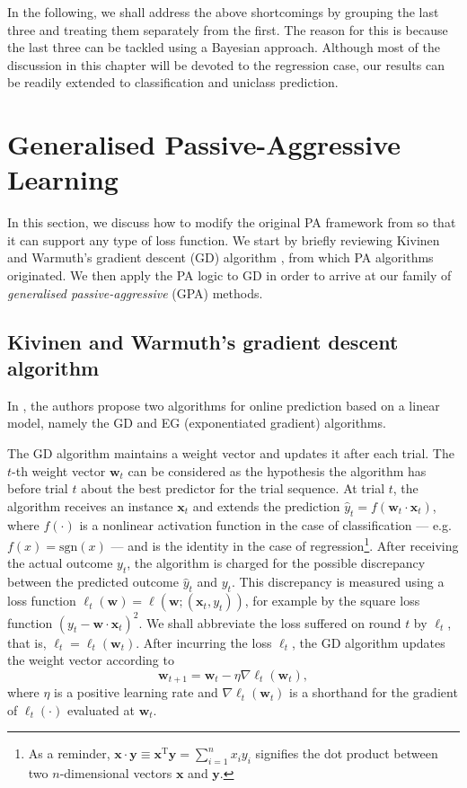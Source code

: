 In the following, we shall address the above shortcomings by grouping the last three and treating them separately from the first. The reason for this is because the last three can be tackled using a Bayesian approach. Although most of the discussion in this chapter will be devoted to the regression case, our results can be readily extended to classification and uniclass prediction.


\section{Generalised Passive-Aggressive Learning}
\label{sec:gpa}

In this section, we discuss how to modify the original PA framework from \citep{crammer06} so that it can support any type of loss function. We start by briefly reviewing Kivinen and Warmuth's gradient descent (GD) algorithm \citep{kivinen97}, from which PA algorithms originated. We then apply the PA logic to GD in order to arrive at our family of \emph{generalised passive-aggressive} (GPA) methods.

\subsection{Kivinen and Warmuth's gradient descent algorithm}

In \citep{kivinen97}, the authors propose two algorithms for online prediction based on a linear model, namely the GD and EG (exponentiated gradient) algorithms.

The GD algorithm maintains a weight vector and updates it after each trial. The $t$-th weight vector $\mathbf{w}_t$ can be considered as the hypothesis the algorithm has before trial $t$ about the best predictor for the trial sequence. At trial $t$, the algorithm receives an instance $\mathbf{x}_t$ and extends the prediction $\hat{y}_t = f(\mathbf{w}_t\cdot\mathbf{x}_t)$, where $f(\cdot)$ is a nonlinear activation function in the case of classification --- e.g.\ $f(x) = \mathrm{sgn}(x)$ --- and is the identity in the case of regression\footnote{As a reminder, $\mathbf{x} \cdot \mathbf{y} \equiv \mathbf{x}^\text{T}\mathbf{y} = \sum_{i=1}^n x_{i}y_{i}$ signifies the dot product between two $n$-dimensional vectors $\mathbf{x}$ and $\mathbf{y}$.}. After receiving the actual outcome $y_t$, the algorithm is charged for the possible discrepancy between the predicted outcome $\hat{y}_t$ and $y_t$. This discrepancy is measured using a loss function $\ell_t(\mathbf{w}) = \ell(\mathbf{w}; (\mathbf{x}_t, y_t))$, for example by the square loss function $(y_t - \mathbf{w}\cdot\mathbf{x}_t)^2$. We shall abbreviate the loss suffered on round $t$ by $\ell_t$, that is, $\ell_t = \ell_t(\mathbf{w}_t)$. After incurring the loss $\ell_t$, the GD algorithm updates the weight vector according to
\begin{equation}
\label{eq:gd-update-rule}
	\mathbf{w}_{t+1}
	= \mathbf{w}_t - \eta\nabla\ell_t(\mathbf{w}_t),
\end{equation}
where $\eta$ is a positive learning rate and $\nabla\ell_t(\mathbf{w}_t)$ is a shorthand for the gradient of $\ell_t(\cdot)$ evaluated at $\mathbf{w}_t$.

